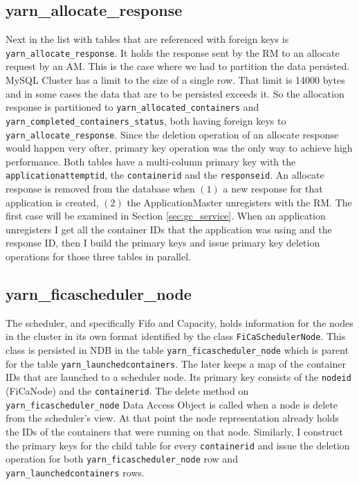 \subsection{yarn\_allocate\_response}
\label{ssec:impl_fk_alloc_resp}
Next in the list with tables that are referenced with foreign keys is
\texttt{yarn\_allocate\_response}. It holds the response sent by the
RM to an allocate request by an AM. This is the case where we had to
partition the data persisted. MySQL Cluster has a limit to the size of
a single row. That limit is 14000 bytes \cite{ndb_row_limit} and in
some cases the data that are to be persisted exceeds it. So the
allocation response is partitioned to
\texttt{yarn\_allocated\_containers} and
\texttt{yarn\_completed\_containers\_status}, both having foreign keys
to \texttt{yarn\_allocate\_response}. Since the deletion operation of
an allocate response would happen very ofter, primary key operation
was the only way to achieve high performance. Both tables have a
multi-column primary key with the \texttt{applicationattemptid}, the
\texttt{containerid} and the \texttt{responseid}. An allocate response
is removed from the database when $(1)$ a new response for that
application is created, $(2)$ the ApplicationMaster unregisters with
the RM. The first case will be examined in Section
\ref{sec:gc_service}. When an application unregisters I get all the
container IDs that the application was using and the response ID,
then I build the primary keys and issue primary key deletion
operations for those three tables in parallel.

\subsection{yarn\_ficascheduler\_node}
\label{ssec:impl_fk_fica_node}
The scheduler, and specifically Fifo and Capacity, holds information for the nodes in the cluster in its
own format identified by the class \texttt{FiCaSchedulerNode}. This
class is persisted in NDB in the table
\texttt{yarn\_ficascheduler\_node} which is parent for the table
\texttt{yarn\_launchedcontainers}. The later keeps a map of the
container IDs that are launched to a scheduler node. Its primary key
consists of the \texttt{nodeid} (FiCaNode) and the
\texttt{containerid}. The delete method on
\texttt{yarn\_ficascheduler\_node} Data Access Object is called when a
node is delete from the scheduler's view. At that point the node
representation already holds the IDs of the containers that were
running on that node. Similarly, I construct the primary keys for the
child table for every \texttt{containerid} and issue the deletion operation for both
\texttt{yarn\_ficascheduler\_node} row and
\texttt{yarn\_launchedcontainers} rows.

